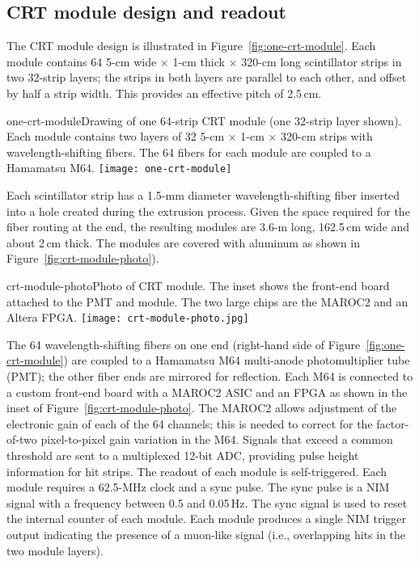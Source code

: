 \subsection{CRT module design and readout}

The CRT module design is illustrated in Figure~\ref{fig:one-crt-module}. Each module contains 64 5-cm wide $\times$ 1-cm thick $\times$ 320-cm long scintillator strips in two 32-strip layers; the strips in both layers are parallel to each other, and offset by half a strip width. This provides an effective pitch of 2.5\,cm.

\begin{cdrfigure}{one-crt-module}{Drawing of one 64-strip CRT module (one 32-strip layer shown).  Each module contains two layers of 32 5-cm $\times$ 1-cm $\times$ 320-cm strips with wavelength-shifting fibers.  The 64 fibers for each module are coupled to a Hamamatsu M64.}
  \texttt{[image: one-crt-module]}
\end{cdrfigure}


Each scintillator strip has a 1.5-mm diameter wavelength-shifting fiber inserted into a hole created during the extrusion process.   Given the space required for the fiber routing at the end, %
the resulting modules are 3.6-m long, 162.5\,cm wide and about 2\,cm thick. The modules are covered with aluminum as shown in Figure~\ref{fig:crt-module-photo}). 


\begin{cdrfigure}{crt-module-photo}{Photo of CRT module. The inset shows the front-end board attached to the PMT and module. The two large chips are the MAROC2 and an Altera FPGA.}
  \texttt{[image: crt-module-photo.jpg]}
\end{cdrfigure}


The 64 wavelength-shifting fibers on one end (right-hand side of  Figure~\ref{fig:one-crt-module})
are coupled to a Hamamatsu M64 multi-anode photomultiplier tube (PMT); the other fiber ends are mirrored for reflection. 
Each M64 is connected to a custom front-end board with a MAROC2 ASIC and an FPGA as shown in the inset of Figure~\ref{fig:crt-module-photo}.
The MAROC2 allows adjustment of the electronic gain of each of the 64 channels; this is needed to correct for the factor-of-two pixel-to-pixel gain variation in the M64.  Signals that exceed a common threshold are sent to a multiplexed 12-bit ADC, providing pulse height information for hit strips. The readout of each module is self-triggered. Each module requires a 62.5-MHz clock and a sync pulse. The sync pulse is a NIM signal with
a frequency between 0.5 and 0.05\,Hz. The sync signal is used to reset the internal counter of each module. 
Each module produces a single NIM trigger output indicating the presence of a muon-like signal (i.e., overlapping hits in the two module layers).


